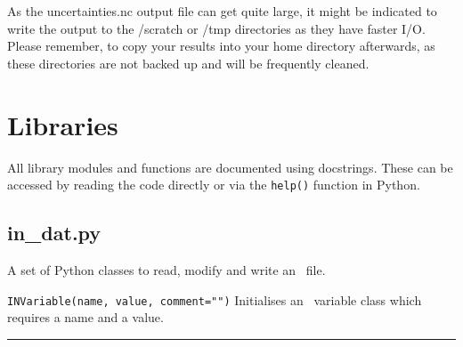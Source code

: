 As the uncertainties.nc output file can get quite large, it might be indicated
to write the output to the /scratch or /tmp directories as they have faster
I/O. Please remember, to copy your results into your home directory
afterwards, as these directories are not backed up and will be frequently
cleaned.


\section{Libraries}
\label{sec:py_lib}

All library modules and functions are documented using docstrings. These can
be accessed by reading the code directly or via the \texttt{help()} function
in Python.

\subsection{in\_dat.py}

A set of Python classes to read, modify and write an \indat\ file.

\begin{description}

\item{\verb|INVariable(name, value, comment="")| } Initialises an \indat\
  variable class which requires a name and a value.

\end{description}

\rule{\textwidth}{0.4pt}

